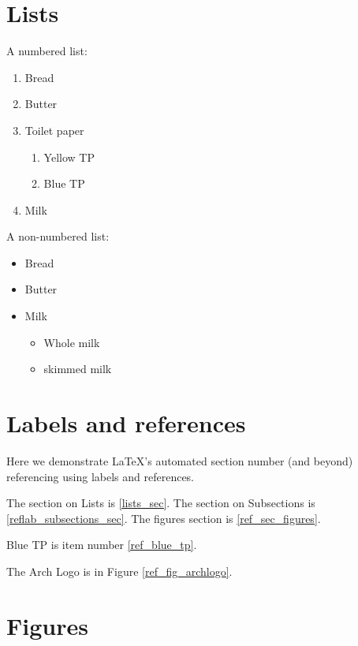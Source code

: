 \documentclass{article}
\begin{document}
  \section{Lists \label{lists_sec}}

    A numbered list:
    \begin{enumerate}
      \item Bread
      \item Butter
      \item Toilet paper
        \begin{enumerate}
          \item Yellow TP
          \item Blue TP \label{ref_blue_tp}
        \end{enumerate}
      \item Milk
    \end{enumerate}

    A non-numbered list:
    \begin{itemize}
      \item Bread
      \item Butter
      \item Milk
        \begin{itemize}
          \item Whole milk 
          \item skimmed milk
        \end{itemize}
    \end{itemize}
  

  \section{Labels and references}

    Here we demonstrate LaTeX's automated section number (and beyond) referencing using labels and references.

    The section on Lists is \ref{lists_sec}. The section on Subsections is \ref{reflab_subsections_sec}. The figures section is \ref{ref_sec_figures}.

    Blue TP is item number \ref{ref_blue_tp}. 

    The Arch Logo is in Figure \ref{ref_fig_archlogo}.

  
  \section{Figures \label{ref_sec_figures}}
\end{document}
